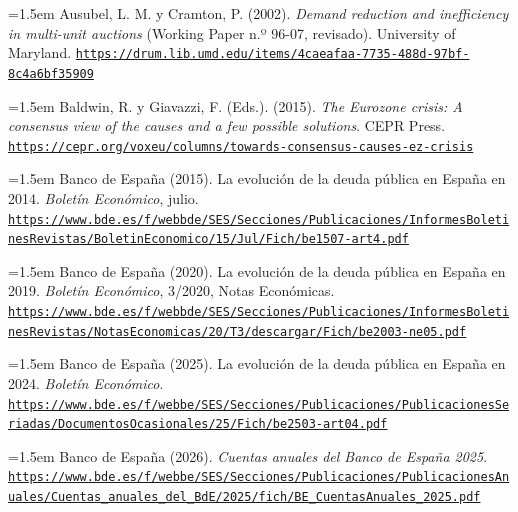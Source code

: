\documentclass[10pt,a4paper]{article}
\begin{document}
\noindent\hangindent=1.5em Ausubel, L. M. y Cramton, P. (2002). \textit{Demand reduction and inefficiency in multi-unit auctions} (Working Paper n.º 96-07, revisado). University of Maryland. \href{https://drum.lib.umd.edu/items/4caeafaa-7735-488d-97bf-8c4a6bf35909}{\nolinkurl{https://drum.lib.umd.edu/items/4caeafaa-7735-488d-97bf-8c4a6bf35909}}

\noindent\hangindent=1.5em Baldwin, R. y Giavazzi, F. (Eds.). (2015). \textit{The Eurozone crisis: A consensus view of the causes and a few possible solutions}. CEPR Press. \href{https://cepr.org/voxeu/columns/towards-consensus-causes-ez-crisis}{\nolinkurl{https://cepr.org/voxeu/columns/towards-consensus-causes-ez-crisis}}

\noindent\hangindent=1.5em Banco de España (2015). La evolución de la deuda pública en España en 2014. \textit{Boletín Económico}, julio. \href{https://www.bde.es/f/webbde/SES/Secciones/Publicaciones/InformesBoletinesRevistas/BoletinEconomico/15/Jul/Fich/be1507-art4.pdf}{\nolinkurl{https://www.bde.es/f/webbde/SES/Secciones/Publicaciones/InformesBoletinesRevistas/BoletinEconomico/15/Jul/Fich/be1507-art4.pdf}}

\noindent\hangindent=1.5em Banco de España (2020). La evolución de la deuda pública en España en 2019. \textit{Boletín Económico}, 3/2020, Notas Económicas. \href{https://www.bde.es/f/webbde/SES/Secciones/Publicaciones/InformesBoletinesRevistas/NotasEconomicas/20/T3/descargar/Fich/be2003-ne05.pdf}{\nolinkurl{https://www.bde.es/f/webbde/SES/Secciones/Publicaciones/InformesBoletinesRevistas/NotasEconomicas/20/T3/descargar/Fich/be2003-ne05.pdf}}

\noindent\hangindent=1.5em Banco de España (2025). La evolución de la deuda pública en España en 2024. \textit{Boletín Económico}. \href{https://www.bde.es/f/webbe/SES/Secciones/Publicaciones/PublicacionesSeriadas/DocumentosOcasionales/25/Fich/be2503-art04.pdf}{\nolinkurl{https://www.bde.es/f/webbe/SES/Secciones/Publicaciones/PublicacionesSeriadas/DocumentosOcasionales/25/Fich/be2503-art04.pdf}}

\noindent\hangindent=1.5em Banco de España (2026). \textit{Cuentas anuales del Banco de España 2025}. \href{https://www.bde.es/f/webbe/SES/Secciones/Publicaciones/PublicacionesAnuales/Cuentas_anuales_del_BdE/2025/fich/BE_CuentasAnuales_2025.pdf}{\nolinkurl{https://www.bde.es/f/webbe/SES/Secciones/Publicaciones/PublicacionesAnuales/Cuentas_anuales_del_BdE/2025/fich/BE_CuentasAnuales_2025.pdf}}
\end{document}
